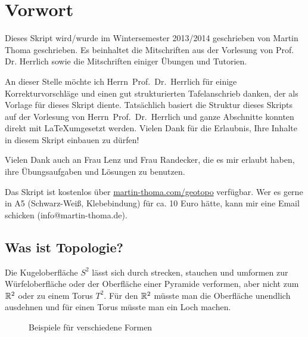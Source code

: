\chapter*{Vorwort}
Dieses Skript wird/wurde im Wintersemester 2013/2014 geschrieben
von Martin Thoma geschrieben. Es beinhaltet die Mitschriften aus
der Vorlesung von Prof. Dr. Herrlich sowie die Mitschriften einiger
Übungen und Tutorien.

An dieser Stelle möchte ich Herrn~Prof.~Dr.~Herrlich für einige 
Korrekturvorschläge und einen gut strukturierten Tafelanschrieb 
danken, der als Vorlage für dieses Skript diente. Tatsächlich basiert
die Struktur dieses Skripts auf der Vorlesung von Herrn~Prof.~Dr.~Herrlich
und ganze Abschnitte konnten direkt mit \LaTeX umgesetzt werden.
Vielen Dank für die Erlaubnis, Ihre Inhalte in diesem Skript einbauen
zu dürfen!

Vielen Dank auch an Frau Lenz und Frau Randecker, die es mir erlaubt 
haben, ihre Übungsaufgaben und Lösungen zu benutzen.

Das Skript ist kostenlos über \href{http://martin-thoma.com/geotopo/}{martin-thoma.com/geotopo}
verfügbar. Wer es gerne in A5 (Schwarz-Weiß, Klebebindung) für ca. 10 Euro hätte, 
kann mir eine Email schicken (info@martin-thoma.de).

\section*{Was ist Topologie?}

Die Kugeloberfläche $S^2$ lässt sich durch strecken, stauchen
und umformen zur Würfeloberfläche oder
der Oberfläche einer Pyramide verformen, aber nicht zum $\mdr^2$
oder zu einem Torus $T^2$. Für den $\mdr^2$ müsste man die Oberfläche
unendlich ausdehnen und für einen Torus müsste man ein Loch machen.

\begin{figure}[ht]
    \centering
    \subfloat[$S^2$]{
        
        \label{fig:s2}
    }%
    \subfloat[Würfel]{
        
        \label{fig:cube}
    }%
    \subfloat[Pyramide]{
        
        \label{fig:pyramide}
    }

    \subfloat[$\mdr^2$]{
        
        \label{fig:plane-r2}
    }%
    \label{Formen}
    \caption{Beispiele für verschiedene Formen}
\end{figure}

